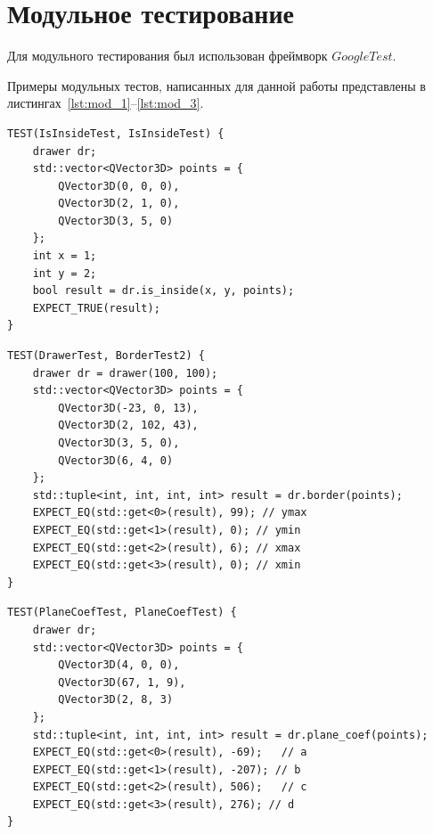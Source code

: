 \section{Модульное тестирование}

Для модульного тестирования был использован фреймворк \textit{$Google Test$}.

Примеры модульных тестов, написанных для данной работы представлены в листингах~\ref{lst:mod_1}--\ref{lst:mod_3}.
\clearpage
\begin{center}
	\captionsetup{justification=raggedright,singlelinecheck=off}
	\begin{lstlisting}[label=lst:mod_1,caption={Тест для функции, которая определяет принадлежность точки полигону}]
TEST(IsInsideTest, IsInsideTest) {
	drawer dr;
	std::vector<QVector3D> points = {
		QVector3D(0, 0, 0),
		QVector3D(2, 1, 0),
		QVector3D(3, 5, 0)
	};
	int x = 1;
	int y = 2;
	bool result = dr.is_inside(x, y, points);
	EXPECT_TRUE(result);
}
	\end{lstlisting}
\end{center}


\begin{center}
	\captionsetup{justification=raggedright,singlelinecheck=off}
	\begin{lstlisting}[label=lst:mod_2,caption={Тест для функции, которая определяет прямоугольник, в который вписан полигон}]
TEST(DrawerTest, BorderTest2) {
	drawer dr = drawer(100, 100);
	std::vector<QVector3D> points = {
		QVector3D(-23, 0, 13),
		QVector3D(2, 102, 43),
		QVector3D(3, 5, 0),
		QVector3D(6, 4, 0)
	};
	std::tuple<int, int, int, int> result = dr.border(points);
	EXPECT_EQ(std::get<0>(result), 99); // ymax
	EXPECT_EQ(std::get<1>(result), 0); // ymin
	EXPECT_EQ(std::get<2>(result), 6); // xmax
	EXPECT_EQ(std::get<3>(result), 0); // xmin
}
	\end{lstlisting}
\end{center}
\clearpage

\begin{center}
	\captionsetup{justification=raggedright,singlelinecheck=off}
	\begin{lstlisting}[label=lst:mod_3,caption={Тест для функции, которая вычисляет коэффициенты плоскости}]
TEST(PlaneCoefTest, PlaneCoefTest) {
	drawer dr;
	std::vector<QVector3D> points = {
		QVector3D(4, 0, 0),
		QVector3D(67, 1, 9),
		QVector3D(2, 8, 3)
	};
	std::tuple<int, int, int, int> result = dr.plane_coef(points);
	EXPECT_EQ(std::get<0>(result), -69);   // a
	EXPECT_EQ(std::get<1>(result), -207); // b
	EXPECT_EQ(std::get<2>(result), 506);   // c
	EXPECT_EQ(std::get<3>(result), 276); // d
}
	\end{lstlisting}
\end{center}



